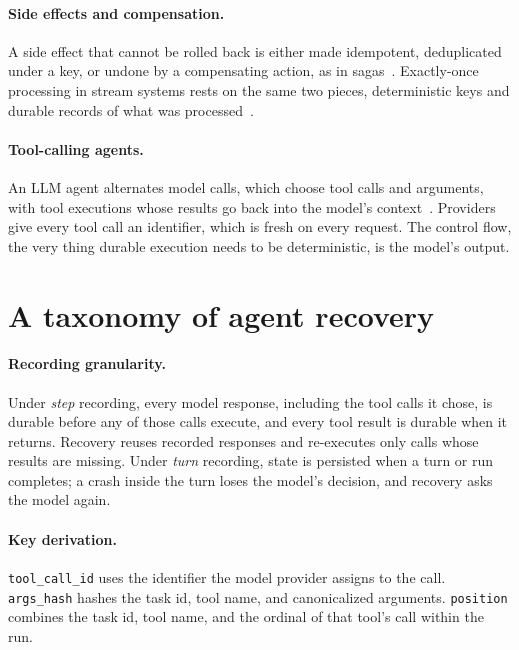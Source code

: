\documentclass[11pt]{article}
\begin{document}
\paragraph{Side effects and compensation.} A side effect that cannot be
rolled back is either made idempotent, deduplicated under a key, or undone by
a compensating action, as in sagas~\cite{garciamolina1987sagas}.
Exactly-once processing in stream systems rests on the same two pieces,
deterministic keys and durable records of what was
processed~\cite{akidau2013millwheel,carbone2017flink}.

\paragraph{Tool-calling agents.} An LLM agent alternates model calls, which
choose tool calls and arguments, with tool executions whose results go back
into the model's context~\cite{yao2022react}. Providers give every tool call
an identifier, which is fresh on every request. The control flow, the very
thing durable execution needs to be deterministic, is the model's output.

\section{A taxonomy of agent recovery}
\label{sec:taxonomy}

\paragraph{Recording granularity.} Under \emph{step} recording, every model
response, including the tool calls it chose, is durable before any of those
calls execute, and every tool result is durable when it returns. Recovery
reuses recorded responses and re-executes only calls whose results are
missing. Under \emph{turn} recording, state is persisted when a turn or run
completes; a crash inside the turn loses the model's decision, and recovery
asks the model again.

\paragraph{Key derivation.} \texttt{tool\_call\_id} uses the identifier the
model provider assigns to the call. \texttt{args\_hash} hashes the task id,
tool name, and canonicalized arguments. \texttt{position} combines the task
id, tool name, and the ordinal of that tool's call within the run.
\end{document}
